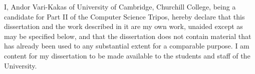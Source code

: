 
\begin{declaration}
I, Andor Vari-Kakas of University of Cambridge, Churchill College, being a candidate for Part II of the Computer Science Tripos, hereby declare that this dissertation and the work described in it are my own work, unaided except as may be specified below, and that the dissertation does not contain material that has already been used to any substantial extent for a comparable purpose. I am content for my dissertation to be made available to the students and staff of the University.
\end{declaration}